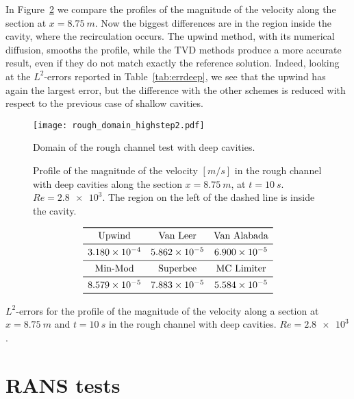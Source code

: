 In Figure~\ref{fig:linecompdeep} we compare the profiles of the magnitude of 
the velocity along the section at $x=\SI{8.75}{m}$. Now the biggest differences 
are in the region inside the cavity, where the recirculation occurs. The upwind 
method, with its numerical diffusion, smooths the profile, while the TVD 
methods produce a more accurate result, even if they do not match exactly the 
reference solution. Indeed, looking at the $L^2$-errors reported in 
Table~\ref{tab:errdeep}, we see that the upwind has again the largest error, 
but the difference with the other schemes is reduced with respect to the 
previous case of shallow cavities.
\begin{figure}
	\centering
	\texttt{[image: rough\_domain\_highstep2.pdf]}
	\caption[Domain of the rough channel test with deep cavities]{Domain of the 
	rough channel test with deep cavities.}
	\label{fig:roughdomdeep}
\end{figure}
\begin{figure}
	\centering
	
	\caption[Profile of the magnitude of the velocity in the rough channel with 
	deep cavities at $Re=\num{2.8e3}$]{Profile of the magnitude of the velocity 
		$[\si{m/s}]$ in the rough channel with deep cavities along the section 
		$x=\SI{8.75}{m}$, at $t=\SI{10}{s}$. $Re=\num{2.8e3}$. The region on 
		the 
		left of the dashed line is inside the cavity.}
	\label{fig:linecompdeep}
\end{figure}
\begin{table}
	\centering
	\[
	\begin{array}{ccc}
	\toprule
	\text{Upwind} & \text{Van Leer} & \text{Van Alabada}\\
	\midrule
	\num{3.180e-4} & \num{5.862e-5} & \num{6.900e-5}\\
	\midrule
	\text{Min-Mod} & \text{Superbee} & \text{MC Limiter} \\
	\midrule
	\num{8.579e-5} & \num{7.883e-5} & \num{5.584e-5}\\
	\bottomrule
	\end{array}
	\]
	\caption[$L^2$-errors for the profile of the magnitude of the velocity in 
	the rough channel with deep cavities]{$L^2$-errors for the profile of the 
	magnitude of the velocity along a section at $x=\SI{8.75}{m}$ and 
	$t=\SI{10}{s}$ in the rough channel with deep cavities. $Re = \num{2.8e3}$.}
	\label{tab:errdeep}
\end{table}
%
\section{RANS tests}
